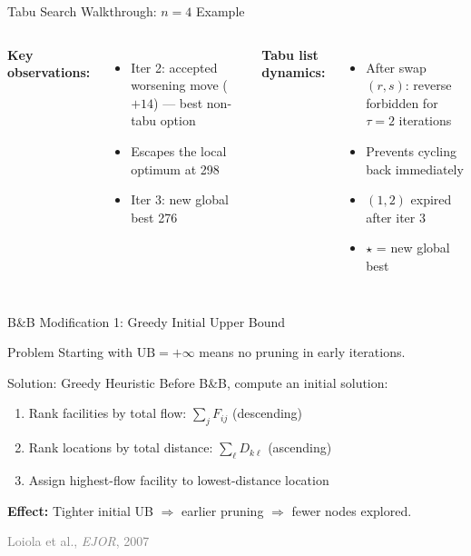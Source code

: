 \documentclass[aspectratio=169,11pt]{beamer}
\newcommand{\reference}[1]{\hfill{\scriptsize\textcolor{gray}{#1}}}
\begin{document}
\begin{frame}[shrink=5]{Tabu Search Walkthrough: $n=4$ Example}
\vspace{4pt}
\begin{columns}[T]
\textbf{Key observations:}
\begin{itemize}\itemsep1pt
  \item Iter 2: \alert{accepted worsening move} ($+14$) --- best non-tabu option
  \item Escapes the local optimum at 298
  \item Iter 3: new global best 276
\end{itemize}
\textbf{Tabu list dynamics:}
\begin{itemize}\itemsep1pt
  \item After swap$(r,s)$: reverse forbidden for $\tau\!=\!2$ iterations
  \item Prevents cycling back immediately
  \item $(1,2)$ expired after iter 3
  \item $\star$ = new global best
\end{itemize}
\end{columns}
\end{frame}


\begin{frame}{B\&B Modification 1: Greedy Initial Upper Bound}
\begin{alertblock}{Problem}
Starting with $\mathrm{UB}=+\infty$ means \alert{no pruning} in early iterations.
\end{alertblock}
\vspace{4pt}
\begin{block}{Solution: Greedy Heuristic}
Before B\&B, compute an initial solution:
\begin{enumerate}
  \item Rank facilities by total flow: $\sum_j F_{ij}$ (descending)
  \item Rank locations by total distance: $\sum_\ell D_{k\ell}$ (ascending)
  \item Assign highest-flow facility to lowest-distance location
\end{enumerate}
\end{block}
\vspace{4pt}
\textbf{Effect:} Tighter initial UB $\Rightarrow$ earlier pruning $\Rightarrow$ \alert{fewer nodes explored}.

\reference{Loiola et al., \emph{EJOR}, 2007}
\end{frame}
\end{document}
